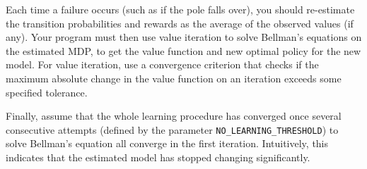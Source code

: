   Each time a failure occurs (such as if the pole falls over), you should 
  re-estimate the transition probabilities and rewards as the average of 
  the observed values (if any).  Your program must then use value iteration 
  to solve Bellman's equations on the estimated MDP, to get the value function 
  and new optimal policy for the new model.  For value iteration, use a 
  convergence criterion that checks if the maximum absolute change in the 
  value function on an iteration exceeds some specified tolerance. 

  Finally, assume that the whole learning procedure has converged 
  once several consecutive attempts (defined by the parameter 
  {\tt NO\_LEARNING\_THRESHOLD}) to solve Bellman's
  equation all converge in the first iteration. Intuitively, this
  indicates that the estimated model has stopped changing significantly.




